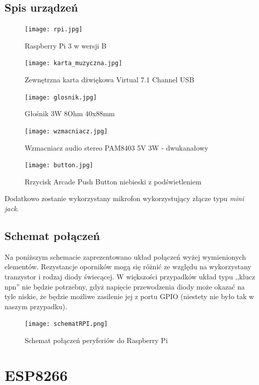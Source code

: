\subsection{Spis urządzeń}

	\begin{figure}[H]
	\centering
	\texttt{[image: rpi.jpg]}
	\caption{Raspberry Pi 3 w wersji B}
	\end{figure}
	
	\begin{figure}[H]
	\centering
	\texttt{[image: karta\_muzyczna.jpg]}
	\caption{Zewnętrzna karta dżwiękowa Virtual 7.1 Channel USB }
	\end{figure}
	
	\begin{figure}[H]
	\centering
	\texttt{[image: glosnik.jpg]}
	\caption{Głośnik 3W 8Ohm 40x88mm}
	\end{figure}
	
	\begin{figure}[H]
	\centering
	\texttt{[image: wzmacniacz.jpg]}
	\caption{Wzmacniacz audio stereo PAM8403 5V 3W - dwukanałowy}
	\end{figure}
	
	\begin{figure}[H]
	\centering
	\texttt{[image: button.jpg]}
	\caption{Rrzycisk Arcade Push Button niebieski z podświetleniem}
	\end{figure}

Dodatkowo zostanie wykorzystany mikrofon wykorzystujący złącze typu \emph{mini jack}.

\subsection{Schemat połączeń}

Na poniższym schemacie zaprezentowano układ połączeń wyżej wymienionych elementów. Rezystancje oporników mogą się różnić ze względu na wykorzystany tranzystor i rodzaj diody świecącej. W większości przypadków układ typu ,,klucz npn'' nie będzie potrzebny, gdyż napięcie przewodzenia diody może okazać na tyle niskie, że będzie możliwe zasilenie jej z portu GPIO (niestety nie było tak w naszym przypadku).

\begin{figure}[H]
	\centering
	\texttt{[image: schematRPI.png]}
	\caption{Schemat połączeń peryferiów do Raspberry Pi}
\end{figure}

\section{ESP8266}

